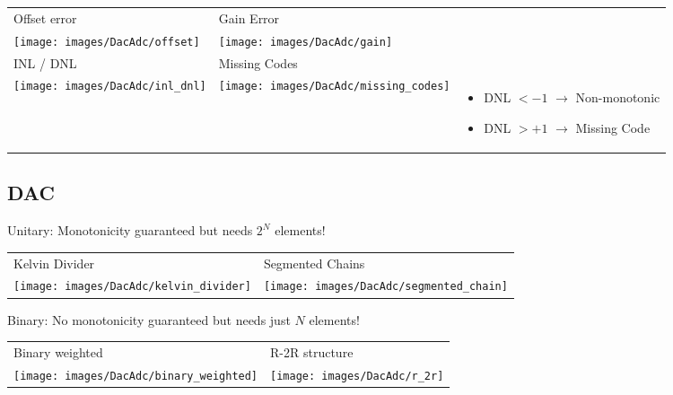 \begin{tabular}{m{5cm} m{5cm} m{5cm}}
 	Offset error & Gain Error & \\ 
	\texttt{[image: images/DacAdc/offset]} & 
	\texttt{[image: images/DacAdc/gain]} & \\ 
		
	INL / DNL & Missing Codes & \\ 
	\texttt{[image: images/DacAdc/inl\_dnl]} & 
	\texttt{[image: images/DacAdc/missing\_codes]} & 
		\begin{minipage}{0.4\textwidth}
		\begin{itemize}
			\item DNL $< -1$ $\rightarrow$ Non-monotonic
			\item DNL $> +1$ $\rightarrow$ Missing Code
		\end{itemize}
		\end{minipage}\\ 

\end{tabular}

\subsection{DAC}
Unitary: Monotonicity guaranteed but needs $2^N$ elements!

\begin{tabular}{m{8cm} m{6cm}}
 	Kelvin Divider & Segmented Chains \\ 
	\texttt{[image: images/DacAdc/kelvin\_divider]} & 
	\texttt{[image: images/DacAdc/segmented\_chain]} \\ 
\end{tabular}

Binary: No monotonicity guaranteed but needs just $N$ elements!

\begin{tabular}{m{8cm} m{8cm}}
 	Binary weighted & R-2R structure \\ 
	\texttt{[image: images/DacAdc/binary\_weighted]} & 
	\texttt{[image: images/DacAdc/r\_2r]} \\ 
\end{tabular}